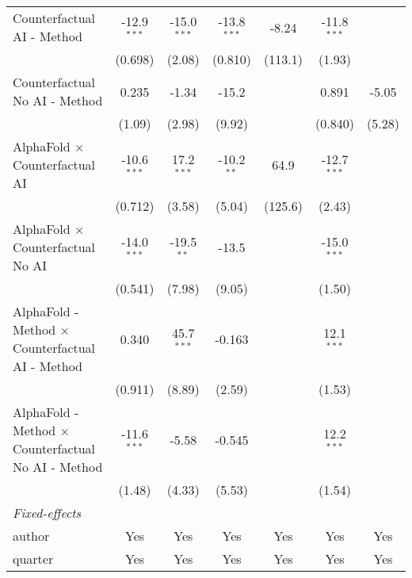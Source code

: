 \begin{tabular}{lcccccc}
   Counterfactual AI - Method                                 & -12.9$^{***}$ & -15.0$^{***}$ & -13.8$^{***}$ & -8.24   & -11.8$^{***}$ &   \\   
                                                              & (0.698)       & (2.08)        & (0.810)       & (113.1) & (1.93)        &   \\   
   Counterfactual No AI - Method                              & 0.235         & -1.34         & -15.2         &         & 0.891         & -5.05\\   
                                                              & (1.09)        & (2.98)        & (9.92)        &         & (0.840)       & (5.28)\\   
   AlphaFold $\times$ Counterfactual AI                       & -10.6$^{***}$ & 17.2$^{***}$  & -10.2$^{**}$  & 64.9    & -12.7$^{***}$ &   \\   
                                                              & (0.712)       & (3.58)        & (5.04)        & (125.6) & (2.43)        &   \\   
   AlphaFold $\times$ Counterfactual No AI                    & -14.0$^{***}$ & -19.5$^{**}$  & -13.5         &         & -15.0$^{***}$ &   \\   
                                                              & (0.541)       & (7.98)        & (9.05)        &         & (1.50)        &   \\   
   AlphaFold - Method $\times$ Counterfactual AI - Method     & 0.340         & 45.7$^{***}$  & -0.163        &         & 12.1$^{***}$  &   \\   
                                                              & (0.911)       & (8.89)        & (2.59)        &         & (1.53)        &   \\   
   AlphaFold - Method $\times$ Counterfactual No AI - Method  & -11.6$^{***}$ & -5.58         & -0.545        &         & 12.2$^{***}$  &   \\   
                                                              & (1.48)        & (4.33)        & (5.53)        &         & (1.54)        &   \\   
   \midrule
   \emph{Fixed-effects}\\
   author                                                     & Yes           & Yes           & Yes           & Yes     & Yes           & Yes\\  
   quarter                                                    & Yes           & Yes           & Yes           & Yes     & Yes           & Yes\\  

\end{tabular}
